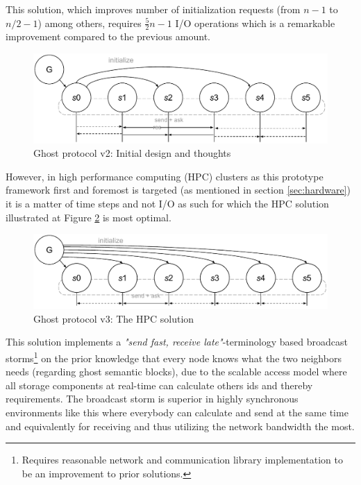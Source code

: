 This solution, which improves number of initialization requests (from $n-1$ to $n/2-1$) among others, requires $\frac{5}{2}n-1$ I/O operations which is a remarkable improvement compared to the previous amount.

\begin{figure}[ht!]
	\centering
	\vspace*{3mm}
	\includegraphics[scale=0.68]{pdf/ghost-v1.pdf}
	\caption{Ghost protocol v2: Initial design and thoughts \label{fig:ghost-v1}}
	\vspace*{3mm}
\end{figure}	

However, in high performance computing (HPC) clusters as this prototype framework first and foremost is targeted (as mentioned in section \ref{sec:hardware}) it is a matter of time steps and not I/O as such for which the HPC solution illustrated at Figure \ref{fig:ghost-final} is most optimal.
\newline

\begin{figure}
	\centering
	\includegraphics[scale=0.68]{pdf/ghost-final.pdf}
	\caption{Ghost protocol v3: The HPC solution \label{fig:ghost-final}}
\end{figure}	

This solution implements a \textit{"send fast, receive late"}-terminology based broadcast storms\footnote{Requires reasonable network and communication library implementation to be an improvement to prior solutions.} on the prior knowledge that every node knows what the two neighbors needs (regarding ghost semantic blocks), due to the scalable access model where all storage components at real-time can calculate others ids and thereby requirements. The broadcast storm is superior in highly synchronous environments like this where everybody can calculate and send at the same time and equivalently for receiving and thus utilizing the network bandwidth the most. 

